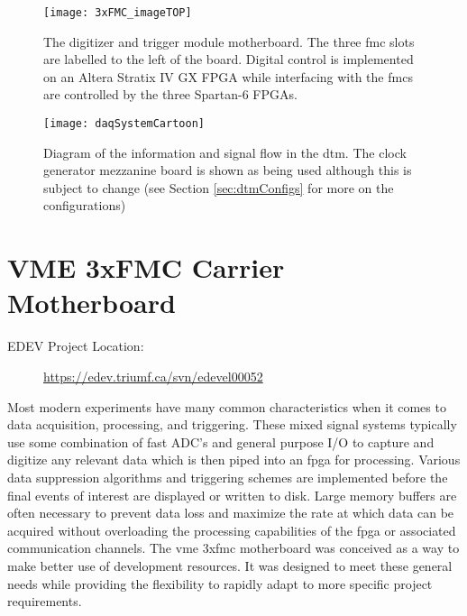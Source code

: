 \begin{figure}[ht]
\centering
\texttt{[image: 3xFMC\_imageTOP]}
\caption{The digitizer and trigger module motherboard. The three \gls{fmc} slots are labelled to the left of the board. Digital control is implemented on an Altera Stratix IV GX FPGA while interfacing with the \gls{fmc}s are controlled by the three Spartan-6 FPGAs.}
\label{Fig:DTM}
\end{figure}



\begin{figure}[ht]
\centering
\texttt{[image: daqSystemCartoon]}
\caption{Diagram of the information and signal flow in the \gls{dtm}. The clock generator mezzanine board is shown as being used although this is subject to change (see Section \ref{sec:dtmConfigs} for more on the configurations)}
\label{Fig:daqSystemCartoon}
\end{figure}


\section{VME 3xFMC Carrier Motherboard}
\begin{description}
\item[EDEV Project Location: ]\url{https://edev.triumf.ca/svn/edevel00052}
\end{description}
Most modern experiments have many common characteristics when it comes to data acquisition, processing, and triggering. These mixed signal systems typically use some combination of fast ADC’s and general purpose I/O to capture and digitize any relevant data which is then piped into an \gls{fpga} for processing. Various data suppression algorithms and triggering schemes are implemented before the final events of interest are displayed or written to disk.
Large memory buffers are often necessary to prevent data loss and maximize the rate at which data can be acquired without overloading the processing capabilities of the \gls{fpga} or associated communication channels. The \gls{vme} 3x\gls{fmc} motherboard was conceived as a way to make better use of development resources. It was designed to meet these general needs while providing the flexibility to rapidly adapt to more specific project requirements.


